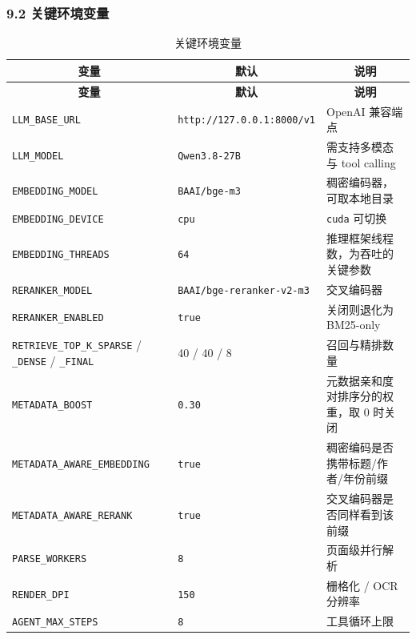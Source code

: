 \documentclass[UTF8,fontset=windows,zihao=5,a4paper]{ctexart}
\begin{document}
\subsubsection*{9.2 关键环境变量}
\begin{longtable}{@{}p{}p{}p{}@{}}
\caption{关键环境变量}\\
\toprule
\multicolumn{1}{c}{\textbf{变量}} & \multicolumn{1}{c}{\textbf{默认}} & \multicolumn{1}{c}{\textbf{说明}} \\
\midrule
\endfirsthead
\toprule
\multicolumn{1}{c}{\textbf{变量}} & \multicolumn{1}{c}{\textbf{默认}} & \multicolumn{1}{c}{\textbf{说明}} \\
\midrule
\endhead
\bottomrule
\endfoot
\texttt{LLM\_\allowbreak{}BASE\_\allowbreak{}URL} & \texttt{http://127.0.0.1:8000/v1} & OpenAI 兼容端点 \\
\texttt{LLM\_\allowbreak{}MODEL} & \texttt{Qwen3.8-27B} & 需支持多模态与 tool calling \\
\texttt{EMBEDDING\_\allowbreak{}MODEL} & \texttt{BAAI/bge-m3} & 稠密编码器，可取本地目录 \\
\texttt{EMBEDDING\_\allowbreak{}DEVICE} & \texttt{cpu} & \texttt{cuda} 可切换 \\
\texttt{EMBEDDING\_\allowbreak{}THREADS} & \texttt{64} & 推理框架线程数，为吞吐的关键参数 \\
\texttt{RERANKER\_\allowbreak{}MODEL} & \texttt{BAAI/bge-reranker-v2-m3} & 交叉编码器 \\
\texttt{RERANKER\_\allowbreak{}ENABLED} & \texttt{true} & 关闭则退化为 BM25-only \\
\texttt{RETRIEVE\_\allowbreak{}TOP\_\allowbreak{}K\_\allowbreak{}SPARSE} / \texttt{\_\allowbreak{}DENSE} / \texttt{\_\allowbreak{}FINAL} & 40 / 40 / 8 & 召回与精排数量 \\
\texttt{METADATA\_\allowbreak{}BOOST} & \texttt{0.30} & 元数据亲和度对排序分的权重，取 0 时关闭 \\
\texttt{METADATA\_\allowbreak{}AWARE\_\allowbreak{}EMBEDDING} & \texttt{true} & 稠密编码是否携带标题/作者/年份前缀 \\
\texttt{METADATA\_\allowbreak{}AWARE\_\allowbreak{}RERANK} & \texttt{true} & 交叉编码器是否同样看到该前缀 \\
\texttt{PARSE\_\allowbreak{}WORKERS} & \texttt{8} & 页面级并行解析 \\
\texttt{RENDER\_\allowbreak{}DPI} & \texttt{150} & 栅格化 / OCR 分辨率 \\
\texttt{AGENT\_\allowbreak{}MAX\_\allowbreak{}STEPS} & \texttt{8} & 工具循环上限 \\
\end{longtable}
\end{document}
